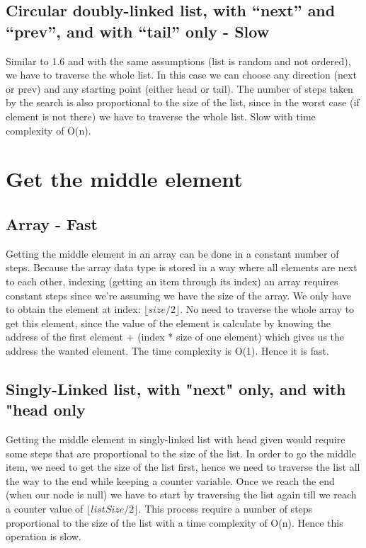 \documentclass{article}
\begin{document}
\subsection{Circular doubly-linked list, with “next” and “prev”, and with “tail” only - Slow}
Similar to 1.6 and with the same assumptions (list is random and not ordered), we have to traverse the whole list. In this case we can choose any direction (next or prev) and any starting point (either head or tail). The number of steps taken by the search is also proportional to the size of the list, since in the worst case (if element is not there) we have to traverse the whole list. Slow with time complexity of O(n).


\section{Get the middle element}
\subsection{Array - Fast}
Getting the middle element in an array can be done in a constant number of steps. Because the array data type is stored in a way where all elements are next to each other, indexing (getting an item through its index) an array requires constant steps since we're assuming we have the size of the array. We only have to obtain the element at index: $\lfloor {size/2} \rfloor$. No need to traverse the whole array to get this element, since the value of the element is calculate by knowing the address of the first element + (index * size of one element) which gives us the address the wanted element. The time complexity is O(1). Hence it is fast.

\subsection{Singly-Linked list, with "next" only, and with "head only}
Getting the middle element in singly-linked list with head given would require some steps that are proportional to the size of the list. In order to go the middle item, we need to get the size of the list first, hence we need to traverse the list all the way to the end while keeping a counter variable. Once we reach the end (when our node is null) we have to start by traversing the list again till we reach a counter value of $\lfloor {listSize/2} \rfloor$. This process require a number of steps proportional to the size of the list with a time complexity of O(n). Hence this operation is slow.
\end{document}
